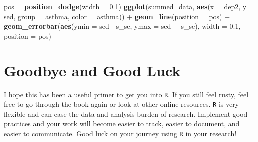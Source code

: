 \documentclass[]{tufte-book}
\newenvironment{Shaded}{}{}
\newcommand{\KeywordTok}[1]{\textcolor[rgb]{0.00,0.44,0.13}{\textbf{#1}}}
\newcommand{\DataTypeTok}[1]{\textcolor[rgb]{0.56,0.13,0.00}{#1}}
\newcommand{\FloatTok}[1]{\textcolor[rgb]{0.25,0.63,0.44}{#1}}
\newcommand{\StringTok}[1]{\textcolor[rgb]{0.25,0.44,0.63}{#1}}
\newcommand{\OperatorTok}[1]{\textcolor[rgb]{0.40,0.40,0.40}{#1}}
\newcommand{\NormalTok}[1]{#1}
\theoremstyle{definition}
\theoremstyle{definition}
\theoremstyle{remark}
\begin{document}
\begin{Shaded}
\begin{Highlighting}[]
\NormalTok{pos =}\StringTok{ }\KeywordTok{position_dodge}\NormalTok{(}\DataTypeTok{width =} \FloatTok{0.1}\NormalTok{)}
\KeywordTok{ggplot}\NormalTok{(summed_data, }\KeywordTok{aes}\NormalTok{(}\DataTypeTok{x =}\NormalTok{ dep2, }\DataTypeTok{y =}\NormalTok{ sed, }\DataTypeTok{group =}\NormalTok{ asthma, }
    \DataTypeTok{color =}\NormalTok{ asthma)) }\OperatorTok{+}\StringTok{ }\KeywordTok{geom_line}\NormalTok{(}\DataTypeTok{position =}\NormalTok{ pos) }\OperatorTok{+}\StringTok{ }
\StringTok{    }\KeywordTok{geom_errorbar}\NormalTok{(}\KeywordTok{aes}\NormalTok{(}\DataTypeTok{ymin =}\NormalTok{ sed }\OperatorTok{-}\StringTok{ }\NormalTok{s_se, }\DataTypeTok{ymax =}\NormalTok{ sed }\OperatorTok{+}\StringTok{ }
\StringTok{        }\NormalTok{s_se), }\DataTypeTok{width =} \FloatTok{0.1}\NormalTok{, }\DataTypeTok{position =}\NormalTok{ pos)}
\end{Highlighting}
\end{Shaded}

\section*{Goodbye and Good Luck}\label{goodbye-and-good-luck}

I hope this has been a useful primer to get you into \texttt{R}. If you
still feel rusty, feel free to go through the book again or look at
other online resources. \texttt{R} is very flexible and can ease the
data and analysis burden of research. Implement good practices and your
work will become easier to track, easier to document, and easier to
communicate. Good luck on your journey using \texttt{R} in your
research!

\begin{Shaded}
\end{Shaded}
\end{document}
